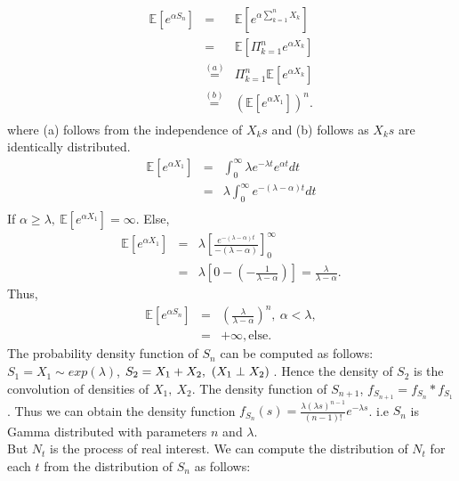 \documentclass[11 pt]{article}
\theoremstyle{plain}
\theoremstyle{definition}
\theoremstyle{remark}
\begin{document}
 \begin{eqnarray*}
  \mathbb{E} [ e^{\alpha S_{n}} ] &=& \mathbb{E}[e^{\alpha\sum^{n}_{k=1}X_{k}} ] \\
   &=&  \mathbb{E}\left[ \Pi_{k=1}^{n}e^{\alpha X_{k}}\right ]\\
   &\stackrel{(a)}{=}&  \Pi_{k=1}^{n} \mathbb{E}\left[ e^{\alpha X_{k}}\right ]\\
   &\stackrel{(b)}{=}& \left(\mathbb{E}[e^{\alpha X_{1}}]\right)^{n}. \\
   \end{eqnarray*}
     where (a) follows from the independence of $X_ks$ and (b) follows as $X_ks$ are identically distributed. 
   \begin{eqnarray*}
\mathbb{ E}[e^{\alpha X_{1}}]  &=& \int^{\infty}_{0}\lambda e^{-\lambda t} e^{\alpha t} dt \\
  &=& \lambda \int^{\infty}_{0} e ^{-(\lambda-\alpha)t} dt\\
  \end{eqnarray*}
   If $\alpha \geq \lambda,~\mathbb{E} [e^{\alpha X_{1}}] = \infty$. Else, 
  \begin{eqnarray*}
  \mathbb{E} [e^{\alpha X_{1}}]&=&\lambda \left[ \frac{e^{-(\lambda-\alpha)t}}{-(\lambda-\alpha)}\right]^{\infty}_{0} \\
   &=& \lambda\left[0-(-\frac{1}{\lambda-\alpha})\right] = \frac{\lambda}{\lambda-\alpha}. 
   \end{eqnarray*}
   Thus,
   \begin{eqnarray*}
   \mathbb{E}[e^{\alpha S_{n}}]&=& \left(\frac{\lambda}{\lambda-\alpha}\right)^{n},~\alpha<\lambda, \\
   &=& +\infty, \text{else}.
\end{eqnarray*}
The probability density function of $S_{n}$ can be computed as follows: $S_{1}=X_{1} \sim  exp(\lambda)$, $S_{2}= X_{1}+ X_{2},~ (X_{1}\perp X_{2}) \hspace{0.1cm}$. Hence the density of $S_2$ is the convolution of densities of $X_1,~X_2$. The density function of $S_{n+1}$, $f_{S_{n+1}}=f_{S_{n}}*f_{S_1}$. Thus we can obtain the density function $f_{S_n}(s)=\frac{\lambda (\lambda s)^{n-1}} {(n-1)!} e^{-\lambda s} $. i.e $S_n$ is Gamma distributed with parameters $n$ and $\lambda$. \\
But $N_{t}$ is the process of real interest. We can compute the distribution of $N_t$ for each $t$ from the distribution of $S_n$ as follows: \\
\end{document}
